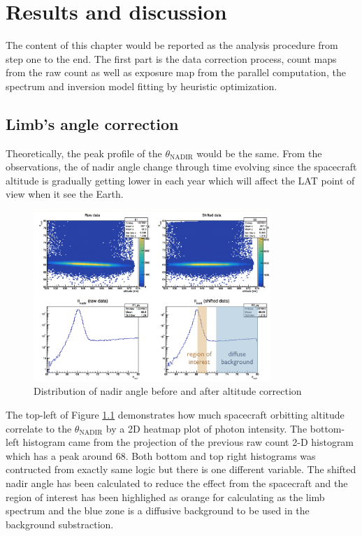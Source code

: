 \chapter{Results and discussion}

The content of this chapter would be reported as the analysis 
procedure from step one to the end. The first part is the data 
correction process, count maps from the raw count as well as 
exposure map from the parallel computation, the spectrum and 
inversion model fitting by heuristic optimization.

\section{Limb's angle correction}
Theoretically, the peak profile of the $\theta_\text{NADIR}$ would be
the same. From the observations, the of nadir angle change through time 
evolving since the spacecraft altitude is gradually getting lower
in each year which will affect the LAT point of view when it see 
the Earth.

\begin{figure}[h]
    \centering
    \includegraphics[width=0.8\textwidth]{content/result_and_discussion/figures/LATShifted.png}
    \caption{Distribution of nadir angle before and after altitude correction}
    \label{fig:lat_nadir_shifted}
\end{figure}


The top-left of Figure \ref{fig:lat_nadir_shifted} demonstrates how 
much spacecraft orbitting altitude correlate to the $\theta_\text{NADIR}$
by a 2D heatmap plot of photon intensity. The bottom-left histogram
came from the projection of the previous raw count 2-D histogram which 
has a peak around 68\textdegree. Both bottom and top right histograms
was contructed from exactly same logic but there is one different 
variable. The shifted nadir angle has been calculated to reduce the 
effect from the spacecraft and the region of interest has been highlighed 
as orange for calculating as the limb spectrum and the blue zone is 
a diffusive background to be used in the background substraction.


